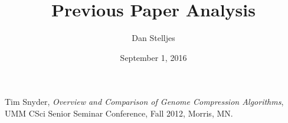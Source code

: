\documentclass[12pt,letterpaper]{article}
\author{Dan Stelljes}
\date{September 1, 2016}
\title{Previous Paper Analysis}
\begin{document}
\maketitle

\begin{thebibliography}{9}

  Tim Snyder,
  \emph{Overview and Comparison of Genome Compression Algorithms},
  UMM CSci Senior Seminar Conference, Fall 2012, Morris, MN.

\end{thebibliography}
\end{document}
